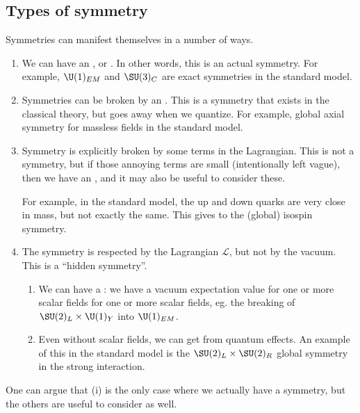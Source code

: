 \documentclass[a4paper]{article}
\begin{document}
\subsection{Types of symmetry}
Symmetries can manifest themselves in a number of ways.
\begin{enumerate}
  \item We can have an , or . In other words, this is an actual symmetry. For example, $\U(1)_{EM}$ and $\SU(3)_C$ are exact symmetries in the standard model.
  \item Symmetries can be broken by an . This is a symmetry that exists in the classical theory, but goes away when we quantize. For example, global axial symmetry for massless fields in the standard model.
  \item Symmetry is explicitly broken by some terms in the Lagrangian. This is not a symmetry, but if those annoying terms are small (intentionally left vague), then we have an , and it may also be useful to consider these.

    For example, in the standard model, the up and down quarks are very close in mass, but not exactly the same. This gives to the (global) isospin symmetry.
  \item The symmetry is respected by the Lagrangian $\mathcal{L}$, but not by the vacuum. This is a ``hidden symmetry''.
    \begin{enumerate}
      \item We can have a : we have a vacuum expectation value for one or more scalar fields for one or more scalar fields, eg. the breaking of $\SU(2)_L \times \U(1)_Y$ into $\U(1)_{EM}$.
      \item Even without scalar fields, we can get  from quantum effects. An example of this in the standard model is the $\SU(2)_L \times \SU(2)_R$ global symmetry in the strong interaction.
    \end{enumerate}
\end{enumerate}
One can argue that (i) is the only case where we actually have a symmetry, but the others are useful to consider as well.
\end{document}
